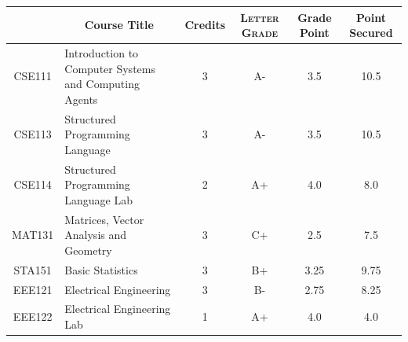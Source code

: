 \documentclass[11pt]{article}
\newcommand*{\numtwo}[1]{\pgfmathprintnumber[
                    fixed, precision=2, fixed zerofill=true]{#1}}
\begin{document}
                \begin{center}
                    \renewcommand{\arraystretch}{1.08}
                    
                \begin{tabular}{|c|l|c|>{\scshape}c|c|c|}
                \hline  \rule[-1ex]{0pt}{3.5ex} {\centering{\bf Course Code}} &  \multicolumn{1}{c|}{\textbf{Course Title}}  & {\bf Credits} & {\bf Letter Grade} & {\bf Grade Point} & {\bf Point Secured}  \\ 
                \hline   CSE111 &  Introduction to Computer Systems and Computing Agents		 & 3 & A- & 3.5 & 10.5 \\ %
                \hline   CSE113 &  Structured Programming Language		 & 3 & A- & 3.5 & 10.5 \\ %
                \hline   CSE114 &  Structured Programming Language Lab		 & 2 & A+ & 4.0 & 8.0 \\ %
                \hline   MAT131 &  Matrices, Vector Analysis and Geometry		 & 3 & C+ & 2.5 & 7.5 \\ %
                \hline   STA151 &  Basic Statistics		 & 3 & B+ & 3.25 & 9.75 \\ %
                \hline   EEE121 &  Electrical Engineering		 & 3 & B- & 2.75 & 8.25 \\ %
                \hline   EEE122 &  Electrical Engineering Lab		 & 1 & A+ & 4.0 & 4.0 \\ %

\hline                %
                \end{tabular}
                \end{center}
                \renewcommand{\arraystretch}{1.03}
\end{document}
